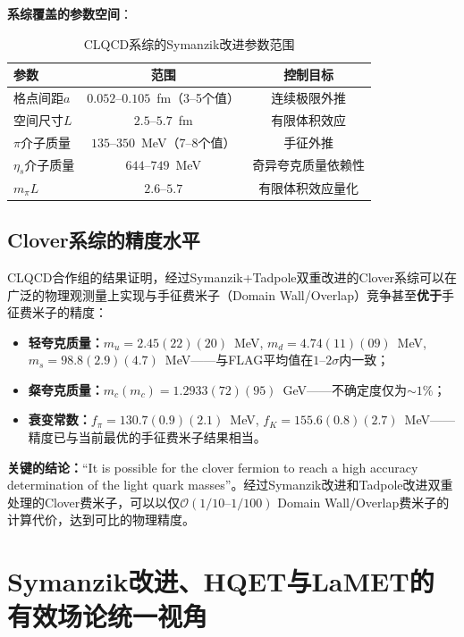 \documentclass[12pt,a4paper]{ctexart}
\theoremstyle{definition}
\begin{document}
\textbf{系综覆盖的参数空间}\cite{CLQCD2025quark_mass,CLQCD2024charm}：

\begin{table}[H]
\centering
\caption{CLQCD系综的Symanzik改进参数范围}
\label{tab:CLQCD_ensemble_range}
\begin{tabular}{lcc}
\toprule
参数 & 范围 & 控制目标 \\
\midrule
格点间距$a$       & $0.052\text{--}0.105$~fm（3--5个值） & 连续极限外推 \\
空间尺寸$L$       & $2.5\text{--}5.7$~fm           & 有限体积效应 \\
$\pi$介子质量     & $135\text{--}350$~MeV（7--8个值）& 手征外推 \\
$\eta_s$介子质量  & $644\text{--}749$~MeV           & 奇异夸克质量依赖性 \\
$m_\pi L$        & $2.6\text{--}5.7$                & 有限体积效应量化 \\
\bottomrule
\end{tabular}
\end{table}

\subsection{Clover系综的精度水平}

CLQCD合作组\cite{CLQCD2025quark_mass,CLQCD2024charm}的结果证明，经过Symanzik+Tadpole双重改进的Clover系综可以在广泛的物理观测量上实现与手征费米子（Domain Wall/Overlap）竞争甚至\textbf{优于}手征费米子的精度：

\begin{itemize}
    \item \textbf{轻夸克质量：}$m_u = 2.45(22)(20)$~MeV, $m_d = 4.74(11)(09)$~MeV, $m_s = 98.8(2.9)(4.7)$~MeV——与FLAG平均值在$1\text{--}2\sigma$内一致；
    \item \textbf{粲夸克质量：}$m_c(m_c) = 1.2933(72)(95)$~GeV——不确定度仅为$\sim 1\%$；
    \item \textbf{衰变常数：}$f_\pi = 130.7(0.9)(2.1)$~MeV, $f_K = 155.6(0.8)(2.7)$~MeV——精度已与当前最优的手征费米子结果相当。
\end{itemize}

\textbf{关键的结论：}``It is possible for the clover fermion to reach a high accuracy determination of the light quark masses''\cite{CLQCD2025quark_mass}。经过Symanzik改进和Tadpole改进双重处理的Clover费米子，可以以仅$\mathcal{O}(1/10\text{--}1/100)$ Domain Wall/Overlap费米子的计算代价，达到可比的物理精度。

\section{Symanzik改进、HQET与LaMET的有效场论统一视角}
\end{document}
